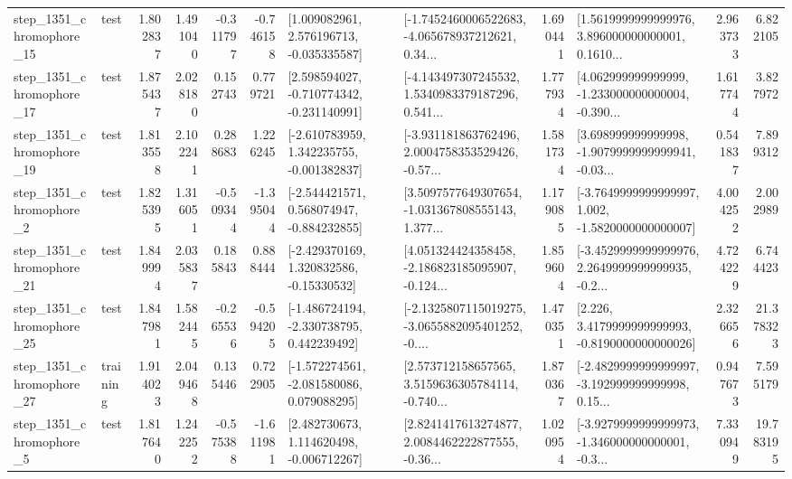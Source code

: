 \begin{tabular}{llrrrrllrlrr}
 step\_1351\_chromophore\_15 &      test &      1.802837 &    1.491040 &     -0.311797 & -0.746158 &    [1.009082961, 2.576196713, -0.035335587] &  [-1.7452460006522683, -4.065678937212621, 0.34... &       1.690441 &  [1.5619999999999976, 3.896000000000001, 0.1610... &            2.963733 &          6.822105 \\
 step\_1351\_chromophore\_17 &      test &      1.875437 &    2.028180 &      0.152743 &  0.779721 &   [2.598594027, -0.710774342, -0.231140991] &  [-4.143497307245532, 1.5340983379187296, 0.541... &       1.777934 &  [4.062999999999999, -1.233000000000004, -0.390... &            1.617744 &          3.827972 \\
 step\_1351\_chromophore\_19 &      test &      1.813558 &    2.102241 &      0.288683 &  1.226245 &   [-2.610783959, 1.342235755, -0.001382837] &  [-3.931181863762496, 2.0004758353529426, -0.57... &       1.581734 &  [3.698999999999998, -1.9079999999999941, -0.03... &            0.541837 &          7.899312 \\
  step\_1351\_chromophore\_2 &      test &      1.825395 &    1.316051 &     -0.509344 & -1.395044 &   [-2.544421571, 0.568074947, -0.884232855] &  [3.5097577649307654, -1.031367808555143, 1.377... &       1.179085 &  [-3.7649999999999997, 1.002, -1.5820000000000007] &            4.004252 &          2.002989 \\
 step\_1351\_chromophore\_21 &      test &      1.849994 &    2.035837 &      0.185843 &  0.888444 &    [-2.429370169, 1.320832586, -0.15330532] &  [4.051324424358458, -2.186823185095907, -0.124... &       1.859604 &  [-3.4529999999999976, 2.2649999999999935, -0.2... &            4.724229 &          6.744423 \\
 step\_1351\_chromophore\_25 &      test &      1.847981 &    1.582445 &     -0.265536 & -0.594205 &   [-1.486724194, -2.330738795, 0.442239492] &  [-2.1325807115019275, -3.0655882095401252, -0.... &       1.470351 &   [2.226, 3.4179999999999993, -0.8190000000000026] &            2.326656 &         21.378323 \\
 step\_1351\_chromophore\_27 &  training &      1.914023 &    2.049468 &      0.135446 &  0.722905 &   [-1.572274561, -2.081580086, 0.079088295] &  [2.573712158657565, 3.5159636305784114, -0.740... &       1.870367 &  [-2.4829999999999997, -3.192999999999998, 0.15... &            0.947673 &          7.595179 \\
  step\_1351\_chromophore\_5 &      test &      1.817640 &    1.242252 &     -0.575388 & -1.611981 &    [2.482730673, 1.114620498, -0.006712267] &  [2.8241417613274877, 2.0084462222877555, -0.36... &       1.020954 &  [-3.9279999999999973, -1.346000000000001, -0.3... &            7.330949 &         19.783195 \\

\end{tabular}
